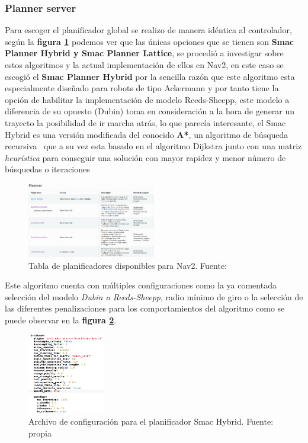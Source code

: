 \subsubsection{Planner server} 
Para escoger el planificador global se realizo de manera idéntica al controlador, según la \textbf{figura \ref{fig:planificadores_tabla}} podemos ver que las únicas opciones que se tienen son 
\textbf{Smac Planner Hybrid y Smac Planner Lattice}, se procedió a investigar sobre estos algoritmos y la actual implementación de ellos en Nav2, en este caso se escogió 
el \textbf{Smac Planner Hybrid} por la sencilla razón que este algoritmo esta especialmente diseñado para robots de tipo Ackermann y por tanto tiene la opción de habilitar 
la implementación de modelo Reeds-Sheepp, este modelo a diferencia de su opuesto (Dubin) toma en consideración a la hora de generar 
un trayecto la posibilidad de ir marcha atrás, lo que parecía interesante, el Smac Hybrid es una versión modificada 
del conocido \textbf{A*}, un algoritmo de búsqueda recursiva~\cite{dolgov2008practical} que a su vez esta basado en el algoritmo Dijkstra junto con una matriz 
\textit{heurística} para conseguir una solución con mayor rapidez y menor número de búsquedas o iteraciones 
\begin{figure}[H]
    \centering
    \includegraphics[width=0.5\textwidth]{images/planificadores_table.png}
    \caption{Tabla de planificadores disponibles para Nav2. Fuente: \cite{nav2}}
    \label{fig:planificadores_tabla}
\end{figure}

\newpage
Este algoritmo cuenta con múltiples configuraciones como la ya comentada selección del modelo \textit{Dubin o Reeds-Sheepp}, radio mínimo de giro 
o la selección de las diferentes penalizaciones para los comportamientos del algoritmo como se puede observar en la \textbf{figura \ref{fig:configuracion_planner}}.

\begin{figure}[H]
    \centering
    \includegraphics[width=0.3\textwidth]{images/smacplanner_configuracion.png}
    \caption{Archivo de configuración para el planificador Smac Hybrid. Fuente: propia}
    \label{fig:configuracion_planner}
\end{figure}


